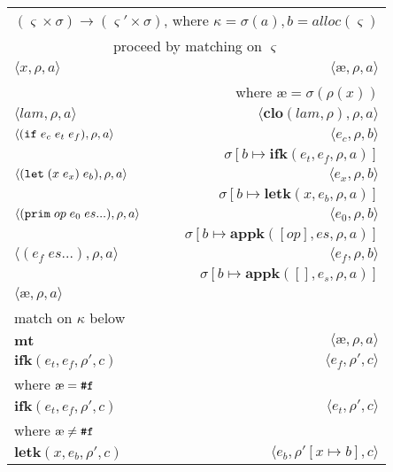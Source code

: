 \documentclass[12pt,draft]{article}
\newcommand\mae{\ensuremath{\text{\ae}}}
\begin{document}
\begin{center}
\begin{tabular}{@{}l | r@{}}
\multicolumn{2}{c}{$(\varsigma \times \sigma) \rightarrow (\varsigma' \times \sigma)$, 
where $\kappa = \sigma(a) , b = alloc(\varsigma) $} \\
\multicolumn{2}{c}{proceed by matching on $\varsigma$} \\
\hline
$\langle
x , \rho , a
\rangle$
&$\langle
\mae , \rho , a
\rangle$ \\
& where $\mae = \sigma(\rho(x))$ \\
\hline
$\langle
lam , \rho , a
\rangle$
&$\langle
\textbf{clo}(lam, \rho) , \rho , a 
\rangle$ \\
\hline
$\langle
(\texttt{if}\;e_c\;e_t\;e_f) , \rho , a
\rangle$
&$\langle
e_c , \rho , b 
\rangle$ \\
& $\sigma[b \mapsto \textbf{ifk}(e_t , e_f , \rho , a)]$ \\
\hline
$\langle
(\texttt{let}\;(x\;e_x)\;e_b) , \rho , a
\rangle$
&$\langle
e_x , \rho , b
\rangle$ \\
& $\sigma[b \mapsto \textbf{letk}(x , e_b , \rho , a)]$ \\
\hline
$\langle
(\texttt{prim}\;op\;e_0\;es ...) , \rho , a
\rangle$
&$\langle
e_0 , \rho , b
\rangle$ \\
& $\sigma[b \mapsto \textbf{appk}([op] ,  es , \rho , a)]$ \\
\hline
$\langle
(e_f \; es ...) , \rho , a
\rangle$
&$\langle
e_f , \rho , b
\rangle$ \\
& $\sigma[b \mapsto \textbf{appk}([] , e_s , \rho , a)]$ \\
\hline
$\langle \mae , \rho , a \rangle$ & \\
match on $\kappa$ below \\
\hline
$ \textbf{mt}$ 
& $\langle \mae , \rho , a \rangle$ \\
\hline
$ \textbf{ifk}(e_t , e_f , \rho' , c) $ 
& $\langle e_f , \rho' , c \rangle$ \\
where $\mae = \falsesyn$ & \\
\hline
$ \textbf{ifk}(e_t , e_f , \rho' , c) $ 
& $\langle e_t , \rho' , c \rangle$ \\
where $\mae \not= \falsesyn$ & \\
\hline
$ \textbf{letk}(x , e_b , \rho' , c) $
& $\langle e_b , \rho'[x \mapsto b] , c \rangle$ \\

\end{tabular}
\end{center}
\end{document}
